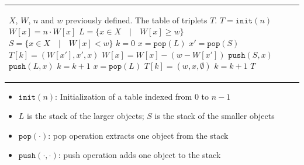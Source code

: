 \begin{algorithm}[htb]
\begin{tabular}{l l}
\begin{minipage}{0.5\textwidth}
\begin{algorithmic}[1]
                \renewcommand{\algorithmicensure}{\textbf{Output:}}
                \Require $X$, $W$, $n$ and $w$ previously defined.
                \Ensure  The table of triplets $T$.
                \Function{Table\_Rust}{$X, n, W, w$}
                    \State $T = \texttt{init}(n)$ %
                    \For{$x \in X$}
                        \State $W[x] = n \cdot W[x]$ %
                    \EndFor
                    \State $L = \{x \in X \quad | \quad W[x] \geq w\}$ %
                    \State $S = \{x \in X \quad | \quad W[x] < w\}$ %
                    \State $k = 0$
                    \While{$S$ is not empty}
                        \State $x = \texttt{pop}(L)$ %
                        \State $x' = \texttt{pop}(S)$ 
                        \State $T[k] = (W[x'], x', x)$
                        \State $W[x] = W[x] - (w - W[x'])$
                        \If{$W[x] < w$}
                            \State $\texttt{push}(S, x)$ %
                        \Else
                            \State $\texttt{push}(L, x)$
                        \EndIf
                        \State $k = k + 1$
                    \EndWhile
                    \While{$L$ is not empty}
                        \State $x = \texttt{pop}(L)$
                        \State $T[k] = (w, x, \emptyset)$
                        \State $k = k + 1$
                    \EndWhile
                    \State \Return $T$
                \EndFunction
            \end{algorithmic}      
        \end{minipage} 
    \end{tabular}
    \begin{itemize}
        \scriptsize
        \item $\texttt{init}(n)$: Initialization of a table indexed from $0$ to $n-1$
        \item $L$ is the stack of the larger objects; $S$ is the stack of the smaller objects
        \item $\texttt{pop}(\cdot)$: pop operation extracts one object from the stack
        \item $\texttt{push}(\cdot, \cdot)$: push operation adds one object to the stack
    \end{itemize}
 \end{algorithm}

